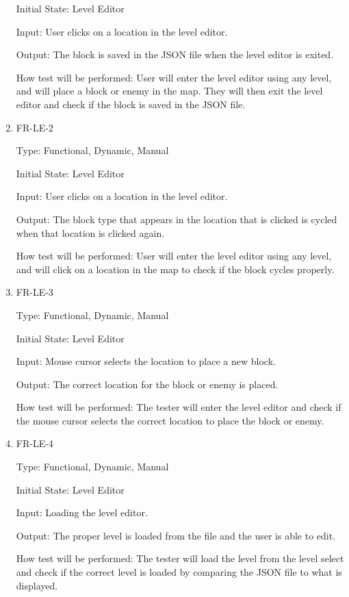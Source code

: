 \documentclass[12pt, titlepage]{article}
\begin{document}
\begin{enumerate}
Initial State: Level Editor

Input: User clicks on a location in the level editor.

Output: The block is saved in the JSON file when the level editor is exited.

How test will be performed: User will enter the level editor using any level, and will place a block or enemy in the map. They will then exit the level editor and check if the block is saved in the JSON file.

\item{FR-LE-2}

Type: Functional, Dynamic, Manual

Initial State: Level Editor

Input: User clicks on a location in the level editor.

Output: The block type that appears in the location that is clicked is cycled when that location is clicked again.

How test will be performed: User will enter the level editor using any level, and will click on a location in the map to check if the block cycles properly.

\item{FR-LE-3}

Type: Functional, Dynamic, Manual

Initial State: Level Editor

Input: Mouse cursor selects the location to place a new block.

Output: The correct location for the block or enemy is placed.

How test will be performed: The tester will enter the level editor and check if the mouse cursor selects the correct location to place the block or enemy.

\item{FR-LE-4}

Type: Functional, Dynamic, Manual

Initial State: Level Editor

Input: Loading the level editor.

Output: The proper level is loaded from the file and the user is able to edit.

How test will be performed: The tester will load the level from the level select and check if the correct level is loaded by comparing the JSON file to what is displayed.

\end{enumerate}
\end{document}
